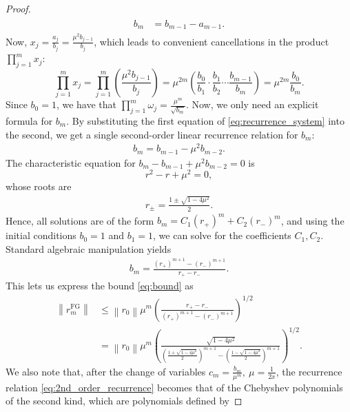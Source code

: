 \documentclass{siamart251216}
\begin{document}
{\begin{proof}
\begin{align}
\begin{aligned}
            b_m & = b_{m-1} - a_{m-1}.
        \end{aligned}
    \end{align}
    Now, $x_j = \frac{a_j}{b_j} = \frac{\mu^2 b_{j-1}}{b_j}$, which leads to convenient cancellations in the product $\prod_{j=1}^m x_j$:
    $$\prod_{j=1}^m x_j = \prod_{j=1}^m \left( \frac{\mu^2 b_{j-1}}{b_j} \right) = \mu^{2m} \left( \frac{b_0}{b_1} \cdot \frac{b_1}{b_2} \cdots \frac{b_{m-1}}{b_m} \right) = \mu^{2m} \frac{b_0}{b_m}.$$
    Since $b_0=1$, we have that $\prod_{j=1}^m \omega_j = \frac{\mu^m}{\sqrt{b_m}}.$
    Now, we only need an explicit formula for $b_m$. By substituting the first equation of \eqref{eq:recurrence_system} into the second, we get a single second-order linear recurrence relation for $b_m$:
    \begin{align} \label{eq:2nd_order_recurrence}
        b_m = b_{m-1} - \mu^2 b_{m-2}.
    \end{align}
    The characteristic equation for $b_m - b_{m-1} + \mu^2 b_{m-2} = 0$ is
    $$r^2 - r + \mu^2 = 0,$$
    whose roots are
    \begin{align*}
        r_{\pm} = \frac{1 \pm \sqrt{1 - 4\mu^2}}{2}.
    \end{align*}
    Hence, all solutions are of the form $b_m = C_1(r_+)^m + C_2(r_-)^m$, and using the initial conditions $b_0 = 1$ and $b_1 = 1$, we can solve for the coefficients $C_1, C_2$. Standard algebraic manipulation yields
    \begin{align} \label{eq:bm}
        b_m = \frac{(r_+)^{m+1} - (r_-)^{m+1}}{r_+ - r_-}.
    \end{align}
    This lets us express the bound \eqref{eq:bound} as
    \begin{equation*}
        \begin{aligned}
            \left\|r_m^{\mathrm{FG}}\right\| & \leq \left\|r_0\right\| \mu^m \left(  \frac{r_+ - r_-}{(r_+)^{m+1} - (r_-)^{m+1}} \right)^{1/2}                                                                                       \\
                                             & =\left\|r_0\right\| \mu^m \left( \frac{\sqrt{1 - 4\mu^2}}{\left( \frac{1 + \sqrt{1 - 4\mu^2}}{2} \right)^{m+1} - \left( \frac{1 - \sqrt{1 - 4\mu^2}}{2} \right)^{m+1}} \right)^{1/2}.
        \end{aligned}
    \end{equation*}
    We also note that, after the change of variables $c_m = \frac{b_m}{\mu^m}, \ \mu = \frac{1}{2x}$, the recurrence relation \eqref{eq:2nd_order_recurrence} becomes that of the Chebyshev polynomials of the second kind, which are polynomials defined by 

\end{proof}}
\end{document}

